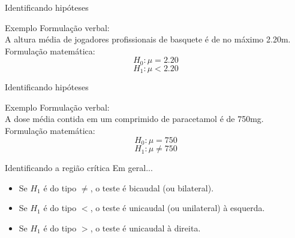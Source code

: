 \documentclass{beamer}
\begin{document}
\begin{frame}{Identificando hipóteses}
  \begin{exampleblock}{Exemplo}
    Formulação verbal:\\
    A altura média de jogadores profissionais de basquete é de no
    máximo 2.20m.\\
    \bigskip
    Formulação matemática:\\
    \begin{displaymath}
      H_0: \mu = 2.20
    \end{displaymath}
    \begin{displaymath}
      H_1: \mu < 2.20
    \end{displaymath}
  \end{exampleblock}
\end{frame}

\begin{frame}{Identificando hipóteses}
  \begin{exampleblock}{Exemplo}
    Formulação verbal:\\
    A dose média contida em um comprimido de paracetamol é de 750mg.\\
    \bigskip
    Formulação matemática:\\
    \begin{displaymath}
      H_0: \mu = 750
    \end{displaymath}
    \begin{displaymath}
      H_1: \mu \ne 750
    \end{displaymath}
  \end{exampleblock}
  \begin{center}
  \end{center}
\end{frame}

\begin{frame}{Identificando a região crítica}
  Em geral...
  \begin{itemize}
  \item Se $H_1$ é do tipo $\ne$, o teste é bicaudal (ou bilateral).
  \item Se $H_1$ é do tipo $<$, o teste é unicaudal (ou unilateral) à esquerda.
  \item Se $H_1$ é do tipo $>$, o teste é unicaudal à direita.
  \end{itemize}
\end{frame}
\end{document}
